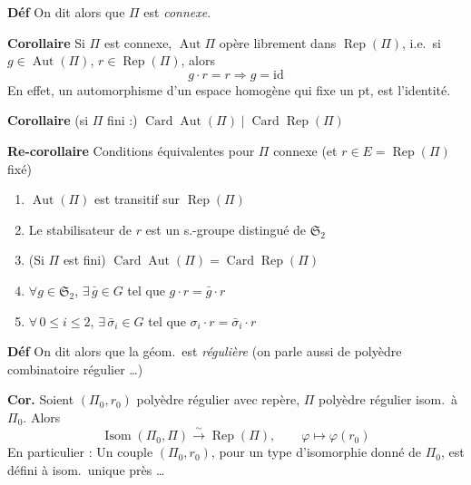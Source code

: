 \documentclass[11pt,a4paper]{article}
\begin{document}
\textbf{} \textbf{Déf} On dit alors que $\Pi$ est
\emph{connexe}.

\textbf{Corollaire} Si $\Pi$ est connexe, $\operatorname{Aut}\Pi$ opère
librement dans $\operatorname{Rep}(\Pi)$, i.e.\ si
$g \in \operatorname{Aut}(\Pi)$, $r \in \operatorname{Rep}(\Pi)$, alors
\[
  g \cdot r = r \Longrightarrow g = \mathrm{id}
\]
En effet, un automorphisme d'un espace homogène qui fixe un pt,
 est l'identité. \struck{\ill{}}

\textbf{Corollaire} (si $\Pi$ fini :) $\operatorname{Card}\operatorname{Aut}(\Pi)
\mid \operatorname{Card}\operatorname{Rep}(\Pi)$

\textbf{Re-corollaire} Conditions équivalentes pour $\Pi$ connexe (et
 $r \in E = \operatorname{Rep}(\Pi)$ fixé)
\begin{enumerate}
  \item[a)] $\operatorname{Aut}(\Pi)$ est transitif sur
  $\operatorname{Rep}(\Pi)$
  \item[b)] Le stabilisateur de $r$ est un s.-groupe distingué de
  $\mathfrak{S}_2$
  \item[c)] (Si $\Pi$ est fini) $\operatorname{Card}\operatorname{Aut}(\Pi) =
  \operatorname{Card}\operatorname{Rep}(\Pi)$
  \item[d)] $\forall g \in \mathfrak{S}_2$, $\exists\, \bar g \in G$ tel que
  $g \cdot r = \bar g \cdot r$
  \item[d')] $\forall\, 0 \leq i \leq 2$, $\exists\, \bar\sigma_i \in G$ tel
  que $\sigma_i \cdot r = \bar\sigma_i \cdot r$
\end{enumerate}

\textbf{Déf} On dit alors que la géom.\ est \emph{régulière} (on parle
aussi de polyèdre combinatoire régulier …)

\textbf{Cor.} Soient $(\Pi_0, r_0)$ polyèdre régulier avec repère, $\Pi$
polyèdre régulier isom.\ à $\Pi_0$. Alors
\[
  \operatorname{Isom}(\Pi_0, \Pi) \xrightarrow{\ \sim\ }
  \operatorname{Rep}(\Pi), \qquad \varphi \longmapsto \varphi(r_0)
\]
En particulier : Un couple $(\Pi_0, r_0)$, pour un type d'isomorphie donné
de $\Pi_0$, est défini à isom.\ unique près …
\end{document}
